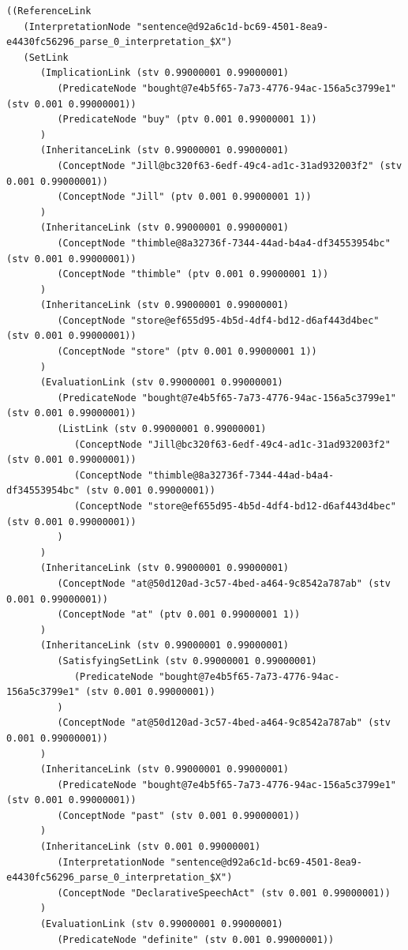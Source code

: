  {\tt\begin{tiny}\begin{lstlisting}
((ReferenceLink
   (InterpretationNode "sentence@d92a6c1d-bc69-4501-8ea9-e4430fc56296_parse_0_interpretation_$X")
   (SetLink
      (ImplicationLink (stv 0.99000001 0.99000001)
         (PredicateNode "bought@7e4b5f65-7a73-4776-94ac-156a5c3799e1" (stv 0.001 0.99000001))
         (PredicateNode "buy" (ptv 0.001 0.99000001 1))
      )
      (InheritanceLink (stv 0.99000001 0.99000001)
         (ConceptNode "Jill@bc320f63-6edf-49c4-ad1c-31ad932003f2" (stv 0.001 0.99000001))
         (ConceptNode "Jill" (ptv 0.001 0.99000001 1))
      )
      (InheritanceLink (stv 0.99000001 0.99000001)
         (ConceptNode "thimble@8a32736f-7344-44ad-b4a4-df34553954bc" (stv 0.001 0.99000001))
         (ConceptNode "thimble" (ptv 0.001 0.99000001 1))
      )
      (InheritanceLink (stv 0.99000001 0.99000001)
         (ConceptNode "store@ef655d95-4b5d-4df4-bd12-d6af443d4bec" (stv 0.001 0.99000001))
         (ConceptNode "store" (ptv 0.001 0.99000001 1))
      )
      (EvaluationLink (stv 0.99000001 0.99000001)
         (PredicateNode "bought@7e4b5f65-7a73-4776-94ac-156a5c3799e1" (stv 0.001 0.99000001))
         (ListLink (stv 0.99000001 0.99000001)
            (ConceptNode "Jill@bc320f63-6edf-49c4-ad1c-31ad932003f2" (stv 0.001 0.99000001))
            (ConceptNode "thimble@8a32736f-7344-44ad-b4a4-df34553954bc" (stv 0.001 0.99000001))
            (ConceptNode "store@ef655d95-4b5d-4df4-bd12-d6af443d4bec" (stv 0.001 0.99000001))
         )
      )
      (InheritanceLink (stv 0.99000001 0.99000001)
         (ConceptNode "at@50d120ad-3c57-4bed-a464-9c8542a787ab" (stv 0.001 0.99000001))
         (ConceptNode "at" (ptv 0.001 0.99000001 1))
      )
      (InheritanceLink (stv 0.99000001 0.99000001)
         (SatisfyingSetLink (stv 0.99000001 0.99000001)
            (PredicateNode "bought@7e4b5f65-7a73-4776-94ac-156a5c3799e1" (stv 0.001 0.99000001))
         )
         (ConceptNode "at@50d120ad-3c57-4bed-a464-9c8542a787ab" (stv 0.001 0.99000001))
      )
      (InheritanceLink (stv 0.99000001 0.99000001)
         (PredicateNode "bought@7e4b5f65-7a73-4776-94ac-156a5c3799e1" (stv 0.001 0.99000001))
         (ConceptNode "past" (stv 0.001 0.99000001))
      )
      (InheritanceLink (stv 0.001 0.99000001)
         (InterpretationNode "sentence@d92a6c1d-bc69-4501-8ea9-e4430fc56296_parse_0_interpretation_$X")
         (ConceptNode "DeclarativeSpeechAct" (stv 0.001 0.99000001))
      )
      (EvaluationLink (stv 0.99000001 0.99000001)
         (PredicateNode "definite" (stv 0.001 0.99000001))

\end{lstlisting}
\end{tiny}}
